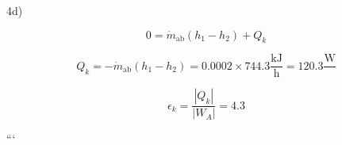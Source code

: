 4d)

\[
0 = \dot{m}_{\text{ab}} (h_1 - h_2) + Q_k
\]

\[
Q_k = -\dot{m}_{\text{ab}} (h_1 - h_2) = 0.0002 \times 744.3 \frac{\text{kJ}}{\text{h}} = 120.3 \frac{\text{W}}{}
\]

\[
\epsilon_k = \frac{|Q_k|}{|W_A|} = 4.3
\]

```
